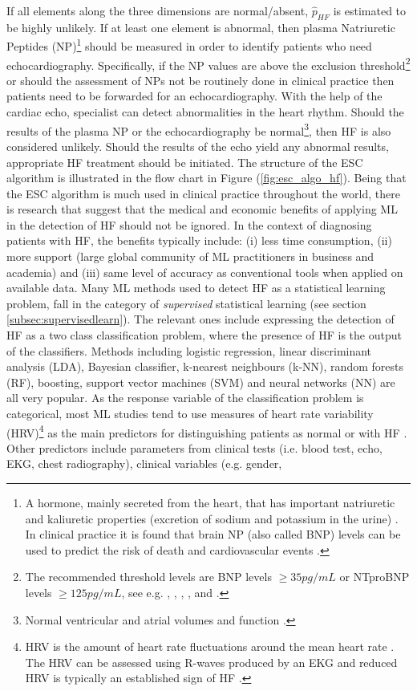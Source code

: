 \documentclass[../thesis.tex]{subfiles}
\begin{document}
\indent If all elements along the three dimensions are normal/absent, $\hat{p}_{HF}$ is estimated to be highly unlikely. If at least one element is abnormal, then plasma Natriuretic Peptides (NP)\footnote{A hormone, mainly secreted from the heart, that has important natriuretic and kaliuretic properties (excretion of sodium and potassium in the urine) \citep{pandit2011natriuretic}. In clinical practice it is found that brain NP (also called BNP) levels can be used to predict the risk of death and cardiovascular events  \citep{wang2004plasma}.} should be measured in order to identify patients who need echocardiography. Specifically, if the NP values are above the exclusion threshold\footnote{The recommended threshold levels are BNP levels $\geq 35 pg/mL$ or NTproBNP levels $\geq 125 pg/mL$, see e.g. \cite{cowie1997value}, \cite{yamamoto2000clinical}, \cite{krishnaswamy2001utility}, \cite{zaphiriou2005diagnostic}, \cite{fuat2006diagnostic} and \cite{maisel2008state}.} or should the assessment of NPs not be routinely done in clinical practice then patients need to be forwarded for an echocardiography. With the help of the cardiac echo, specialist can detect abnormalities in the heart rhythm. Should the results of the plasma NP or the echocardiography be normal\footnote{Normal ventricular and atrial volumes and function \citep{aune2009normal}.}, then HF is also considered unlikely.  Should the results of the echo yield any abnormal results, appropriate HF treatment should be initiated. The structure of the ESC algorithm is illustrated in the flow chart in Figure (\ref{fig:esc_algo_hf}). Being that the ESC algorithm is much used in clinical practice throughout the world, there is research that suggest that the medical and economic benefits of applying ML in the detection of HF should not be ignored. In the context of diagnosing patients with HF, the benefits typically include: (i) less time consumption, (ii) more support (large global community of ML practitioners in business and academia) and (iii) same level of accuracy as conventional tools when applied on available data. Many ML methods used to detect HF as a statistical learning problem, fall in the category of \textit{supervised} statistical learning (see section \ref{subsec:supervisedlearn}). The relevant ones include expressing the detection of HF as a two class classification problem, where the presence of HF is the output of the classifiers. Methods including logistic regression, linear discriminant analysis (LDA), Bayesian classifier, k-nearest neighbours (k-NN), random forests (RF), boosting, support vector machines (SVM) and neural networks (NN) are all very popular. As the response variable of the classification problem is categorical, most ML studies tend to use measures of heart rate variability (HRV)\footnote{HRV is the amount of heart rate fluctuations around the mean heart rate \citep{van1993heart}. The HRV can be assessed using R-waves produced by an EKG and reduced HRV is typically an established sign of HF \citep{ernst2016heart}.} as the main predictors for distinguishing patients as normal or with HF \citep{tripoliti2017heart}. Other predictors include parameters from clinical tests (i.e. blood test, echo, EKG, chest radiography), clinical variables (e.g. gender, 
\end{document}
